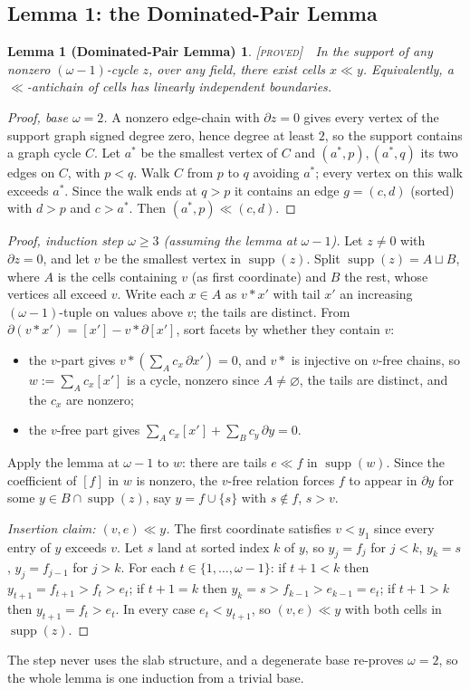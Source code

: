 \documentclass[11pt,reqno]{amsart}
\theoremstyle{plain}
\theoremstyle{definition}
\theoremstyle{plain}
\newtheorem*{lemDP}{Lemma 1 (Dominated-Pair Lemma)}
\newcommand{\st}{\textsc}
\begin{document}
\subsection{Lemma 1: the Dominated-Pair Lemma}
\begin{lemDP}
\textnormal{\st{[proved]}}\ \ In the support of any nonzero $(\omega-1)$-cycle $z$, over any
field, there exist cells $x\ll y$. Equivalently, a $\ll$-antichain of cells has linearly
independent boundaries.
\end{lemDP}
\begin{proof}[Proof, base $\omega=2$]
A nonzero edge-chain with $\partial z=0$ gives every vertex of the support graph signed degree
zero, hence degree at least $2$, so the support contains a graph cycle $C$. Let $a^*$ be the
smallest vertex of $C$ and $(a^*,p),(a^*,q)$ its two edges on $C$, with $p<q$. Walk $C$ from
$p$ to $q$ avoiding $a^*$; every vertex on this walk exceeds $a^*$. Since the walk ends at
$q>p$ it contains an edge $g=(c,d)$ (sorted) with $d>p$ and $c>a^*$. Then $(a^*,p)\ll(c,d)$.
\end{proof}
\begin{proof}[Proof, induction step $\omega\ge3$ (assuming the lemma at $\omega-1$)]
Let $z\ne0$ with $\partial z=0$, and let $v$ be the smallest vertex in $\operatorname{supp}(z)$.
Split $\operatorname{supp}(z)=A\sqcup B$, where $A$ is the cells containing $v$ (as first
coordinate) and $B$ the rest, whose vertices all exceed $v$. Write each $x\in A$ as $v*x'$ with
tail $x'$ an increasing $(\omega-1)$-tuple on values above $v$; the tails are distinct. From
$\partial(v*x')=[x']-v*\partial[x']$, sort facets by whether they contain $v$:
\begin{itemize}
\item the $v$-part gives $v*(\sum_A c_x\,\partial x')=0$, and $v*$ is injective on $v$-free
chains, so $w:=\sum_A c_x[x']$ is a cycle, nonzero since $A\ne\varnothing$, the tails are
distinct, and the $c_x$ are nonzero;
\item the $v$-free part gives $\sum_A c_x[x']+\sum_B c_y\,\partial y=0$.
\end{itemize}
Apply the lemma at $\omega-1$ to $w$: there are tails $e\ll f$ in $\operatorname{supp}(w)$.
Since the coefficient of $[f]$ in $w$ is nonzero, the $v$-free relation forces $f$ to appear
in $\partial y$ for some $y\in B\cap\operatorname{supp}(z)$, say $y=f\cup\{s\}$ with $s\notin f$,
$s>v$.

\emph{Insertion claim: $(v,e)\ll y$.} The first coordinate satisfies $v<y_1$ since every entry
of $y$ exceeds $v$. Let $s$ land at sorted index $k$ of $y$, so $y_j=f_j$ for $j<k$, $y_k=s$,
$y_j=f_{j-1}$ for $j>k$. For each $t\in\{1,\dots,\omega-1\}$: if $t+1<k$ then
$y_{t+1}=f_{t+1}>f_t>e_t$; if $t+1=k$ then $y_k=s>f_{k-1}>e_{k-1}=e_t$; if $t+1>k$ then
$y_{t+1}=f_t>e_t$. In every case $e_t<y_{t+1}$, so $(v,e)\ll y$ with both cells in
$\operatorname{supp}(z)$.
\end{proof}
The step never uses the slab structure, and a degenerate base re-proves $\omega=2$, so the
whole lemma is one induction from a trivial base.
\end{document}
